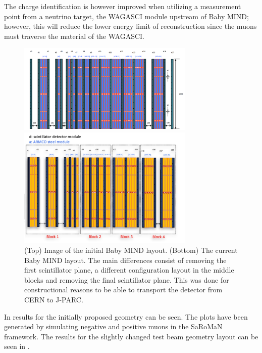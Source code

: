 The charge identification is however improved when utilizing a measurement point from a neutrino target, the WAGASCI module upstream of Baby MIND; however, this will reduce the lower energy limit of reconstruction since the muons must traverse the material of the WAGASCI. 

\begin{figure}[h!]
\centering
\includegraphics[width=0.75\textwidth]{figures/oldStudies/oldMIND.png}

\includegraphics[width=0.75\textwidth]{figures/MIND.jpeg}
\caption{(Top) Image of the initial Baby MIND layout. (Bottom) The current Baby MIND layout. The main differences consist of removing the first scintillator plane, a different configuration layout in the middle blocks and removing the final scintillator plane. This was done for constructional reasons to be able to transport the detector from CERN to J-PARC.}
\label{fig:oldMIND}
\end{figure}

In  results for the initially proposed geometry can be seen. The plots have been generated by simulating negative and positive muons in the SaRoMaN framework. The results for the slightly changed test beam geometry layout can be seen in . 

